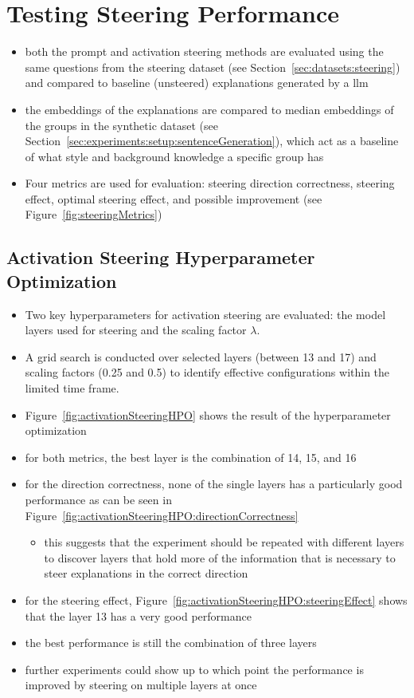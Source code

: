 \section{Testing Steering Performance}%
\label{sec:evaluation:steering}
\begin{itemize}
  \item both the prompt and activation steering methods are evaluated using the same questions from the steering dataset (see Section~\ref{sec:datasets:steering}) and compared to baseline (unsteered) explanations generated by a \acl{llm}
  \item the embeddings of the explanations are compared to median embeddings of the groups in the synthetic dataset (see Section~\ref{sec:experiments:setup:sentenceGeneration}), which act as a baseline of what style and background knowledge a specific group has
  \item Four metrics are used for evaluation: steering direction correctness, steering effect, optimal steering effect, and possible improvement (see Figure~\ref{fig:steeringMetrics})
\end{itemize}


\subsection{Activation Steering Hyperparameter Optimization}%
\label{sec:evaluation:steering:activationHPO}
\begin{itemize}
  \item Two key hyperparameters for activation steering are evaluated: the model layers used for steering and the scaling factor \(\lambda\).
  \item A grid search is conducted over selected layers (between \num{13} and \num{17}) and scaling factors (\num{0.25} and \num{0.5}) to identify effective configurations within the limited time frame.
  \item Figure~\ref{fig:activationSteeringHPO} shows the result of the hyperparameter optimization
  \item for both metrics, the best layer is the combination of \num{14}, \num{15}, and \num{16}
  \item for the direction correctness, none of the single layers has a particularly good performance as can be seen in Figure~\ref{fig:activationSteeringHPO:directionCorrectness}
        \begin{itemize}
          \item this suggests that the experiment should be repeated with different layers to discover layers that hold more of the information that is necessary to steer explanations in the correct direction
        \end{itemize}
  \item for the steering effect, Figure~\ref{fig:activationSteeringHPO:steeringEffect} shows that the layer \num{13} has a very good performance
  \item the best performance is still the combination of three layers
  \item further experiments could show up to which point the performance is improved by steering on multiple layers at once
\end{itemize}

